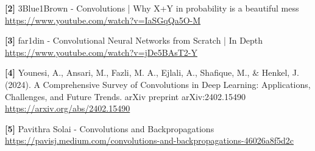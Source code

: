 \documentclass{article}
\begin{document}
    \textbf{[2]} 3Blue1Brown - Convolutions | Why X+Y in probability is a beautiful mess \\
    \url{https://www.youtube.com/watch?v=IaSGqQa5O-M}
    
    \textbf{[3]} far1din - Convolutional Neural Networks from Scratch | In Depth \\
    \url{https://www.youtube.com/watch?v=jDe5BAsT2-Y}
    
    \textbf{[4]} Younesi, A., Ansari, M., Fazli, M. A., Ejlali, A., Shafique, M., \& Henkel, J. (2024). A Comprehensive Survey of Convolutions in Deep Learning: Applications, Challenges, and Future Trends. arXiv preprint arXiv:2402.15490 \\
    \url{https://arxiv.org/abs/2402.15490}

    \textbf{[5]} Pavithra Solai - Convolutions and Backpropagations \\
    \url{https://pavisj.medium.com/convolutions-and-backpropagations-46026a8f5d2c}
\end{document}
